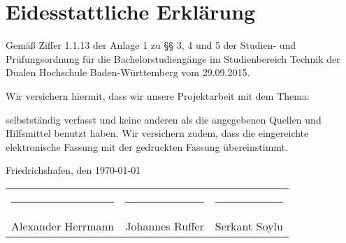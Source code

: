 \chapter*{Eidesstattliche Erklärung} %


Gemäß Ziffer 1.1.13 der Anlage 1 zu §§ 3, 4 und 5  der Studien- und Prüfungsordnung für die Bachelorstudiengänge im Studienbereich Technik der Dualen Hochschule Baden-Würt­tem­berg vom 29.09.2015.

Wir versichern hiermit, dass wir unsere Projektarbeit mit dem Thema: 

\begin{quote}
	\textit{\titel} \textit{ \untertitel }
\end{quote}

selbstständig verfasst und keine anderen als die angegebenen Quellen und Hilfsmittel benutzt haben. Wir versichern zudem, dass die eingereichte elektronische Fassung mit der gedruckten Fassung übereinstimmt.

Friedrichshafen, den \today \\[2ex]

\begin{center}

\begin{tabular}{ccc}
	\rule[-0.2cm]{0.3\linewidth}{0.5pt} & \rule[-0.2cm]{0.3\linewidth}{0.5pt} & \rule[-0.2cm]{0.3\linewidth}{0.5pt}\\
	Alexander Herrmann & Johannes Ruffer & Serkant Soylu\\

\end{tabular}

\end{center}



\normalsize

\rmfamily



\cleardoublepage